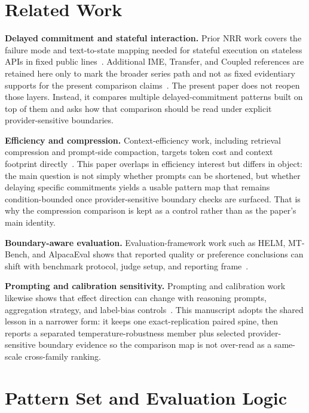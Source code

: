 \documentclass[11pt,a4paper]{article}
\begin{document}
\section{Related Work}
\label{sec:related}

\textbf{Delayed commitment and stateful interaction.}
Prior NRR work covers the failure mode and text-to-state mapping needed for stateful execution on stateless APIs in fixed public lines~\cite{saito2025nrr,saito2026phi}. Additional IME, Transfer, and Coupled references are retained here only to mark the broader series path and not as fixed evidentiary supports for the present comparison claims~\cite{saito2026ime,saito2026transfer,saito2026coupled}. The present paper does not reopen those layers. Instead, it compares multiple delayed-commitment patterns built on top of them and asks how that comparison should be read under explicit provider-sensitive boundaries.

\textbf{Efficiency and compression.}
Context-efficiency work, including retrieval compression and prompt-side compaction, targets token cost and context footprint directly~\cite{xu2023recomp,chevalier2023compress}. This paper overlaps in efficiency interest but differs in object: the main question is not simply whether prompts can be shortened, but whether delaying specific commitments yields a usable pattern map that remains condition-bounded once provider-sensitive boundary checks are surfaced. That is why the compression comparison is kept as a control rather than as the paper's main identity.

\textbf{Boundary-aware evaluation.}
Evaluation-framework work such as HELM, MT-Bench, and AlpacaEval shows that reported quality or preference conclusions can shift with benchmark protocol, judge setup, and reporting frame~\cite{liang2022helm,zheng2023mtbench,dubois2024alpacaeval}.

\textbf{Prompting and calibration sensitivity.}
Prompting and calibration work likewise shows that effect direction can change with reasoning prompts, aggregation strategy, and label-bias controls~\cite{kojima2022zeroshot,wang2023selfconsistency,zhao2021calibrate}. This manuscript adopts the shared lesson in a narrower form: it keeps one exact-replication paired spine, then reports a separated temperature-robustness member plus selected provider-sensitive boundary evidence so the comparison map is not over-read as a same-scale cross-family ranking.

\section{Pattern Set and Evaluation Logic}
\label{sec:method}
\end{document}
